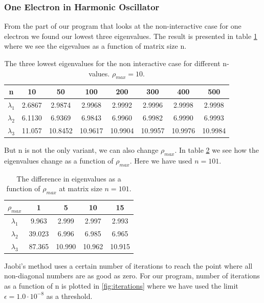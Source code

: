 \documentclass{article}
\begin{document}
\subsubsection{One Electron in Harmonic Oscillator}
From the part of our program that looks at the non-interactive case for one electron we found our lowest three eigenvalues. The result is presented in table \ref{tab:eigenvalues} where we see the eigevalues as a function of matrix size n.
\begin{table}[H]
\centering
\begin{tabular}{c|c|c|c|c|c|c|c} 
n & 10 & 50 & 100 & 200 & 300 & 400 & 500 \\ \hline
$\lambda_1$ & 2.6867 & 2.9874  & 2.9968  & 2.9992  & 2.9996 & 2.9998  & 2.9998 \\ \hline
$\lambda_2$ & 6.1130 & 6.9369  & 6.9843  & 6.9960  & 6.9982 & 6.9990  & 6.9993\\ \hline
$\lambda_3$ & 11.057 & 10.8452 & 10.9617 & 10.9904 & 10.9957& 10.9976 & 10.9984\\ 
\end{tabular}
\caption{The three lowest eigenvalues for the non interactive case for different n-values. $\rho_{max} = 10.$}
\label{tab:eigenvalues}
\end{table}
But n is not the only variant, we can also change $\rho_{max}$. In table \ref{tab:rhoeigenvalues} we see how the eigenvalues change as a function of $\rho_{max}$. Here we have used $n = 101$.
\begin{table}[H]
\centering
\begin{tabular}{c|c|c|c|c}
$\rho_{max}$ & 1 & 5 & 10 & 15 \\ \hline
$\lambda_1$ &  9.963  & 2.999  & 2.997  & 2.993 \\ \hline
$\lambda_2$ &  39.023 & 6.996  & 6.985  & 6.965 \\ \hline
$\lambda_3$ &  87.365 & 10.990 & 10.962 & 10.915 \\ 
\end{tabular}
\caption{The difference in eigenvalues as a function of $\rho_{max}$ at matrix size $n = 101$.}
\label{tab:rhoeigenvalues}
\end{table}
Jaobi's method uses a certain number of iterations to reach the point where all non-diagonal numbers are as good as zero. For our program, number of iterations as a function of n is plotted in \ref{fig:iterations} where we have used the limit $\epsilon = 1.0\cdot 10^{-8}$ as a threshold.
\end{document}
